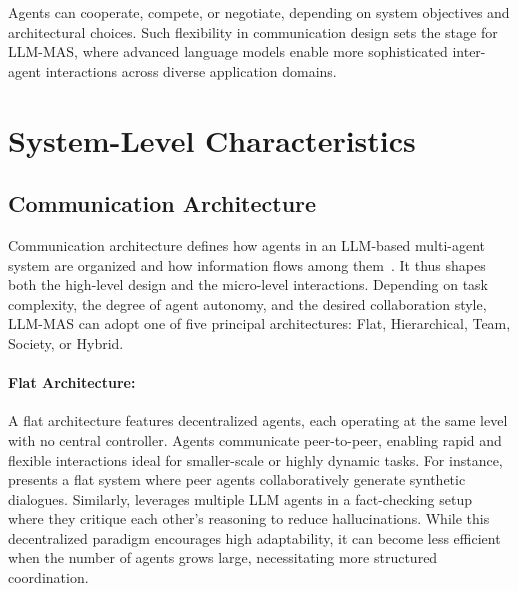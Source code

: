 Agents can cooperate, compete, or negotiate, depending on system objectives and architectural choices. Such flexibility in communication design sets the stage for LLM-MAS, where advanced language models enable more sophisticated inter-agent interactions across diverse application domains.

\section{System-Level Characteristics}
\subsection{Communication Architecture}
Communication architecture defines how agents in an LLM-based multi-agent system are organized and how information flows among them~\cite{mas_a_survey}. It thus shapes both the high-level design and the micro-level interactions. Depending on task complexity, the degree of agent autonomy, and the desired collaboration style, LLM-MAS can adopt one of five principal architectures: Flat, Hierarchical, Team, Society, or Hybrid.


\paragraph{Flat Architecture:}A flat architecture features decentralized agents, each operating at the same level with no central controller. Agents communicate peer-to-peer, enabling rapid and flexible interactions ideal for smaller-scale or highly dynamic tasks. For instance, \cite{dataset_generation} presents a flat system where peer agents collaboratively generate synthetic dialogues. Similarly, \cite{debate_improve_llm_1} leverages multiple LLM agents in a fact-checking setup where they critique each other's reasoning to reduce hallucinations. While this decentralized paradigm encourages high adaptability, it can become less efficient when the number of agents grows large, necessitating more structured coordination.



